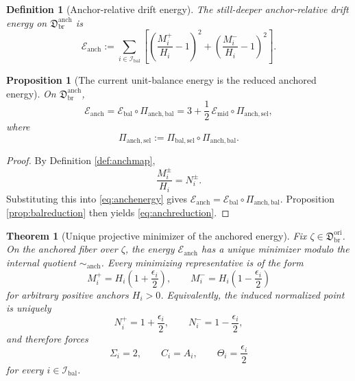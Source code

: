 \documentclass[11pt]{article}
\newcommand{\OriginSector}{\mathfrak D_{\mathrm{br}}^{\mathrm{ori}}}
\newcommand{\SelEnergy}{\mathscr E_{\mathrm{mid}}}
\newcommand{\BalSelMap}{\Pi_{\mathrm{bal,sel}}}
\newcommand{\BalEnergy}{\mathscr E_{\mathrm{bal}}}
\newcommand{\BalOriginSector}{\mathfrak D_{\mathrm{br}}^{\mathrm{anch}}}
\newcommand{\BalOriginMap}{\Pi_{\mathrm{anch,bal}}}
\newcommand{\AnchSelMap}{\Pi_{\mathrm{anch,sel}}}
\newcommand{\AnchProjRel}{\sim_{\mathrm{anch}}}
\newcommand{\AnchEnergy}{\mathscr E_{\mathrm{anch}}}
\newcommand{\BalIndex}{\mathcal I_{\mathrm{bal}}}
\newtheorem{definition}{Definition}
\newtheorem{proposition}{Proposition}
\newtheorem{theorem}{Theorem}
\begin{document}
\begin{definition}[Anchor-relative drift energy]
\label{def:anchenergy}
The still-deeper anchor-relative drift energy on \(\BalOriginSector\) is
\begin{equation}
\AnchEnergy
:=
\sum_{i\in\BalIndex}
\left[
\left(\frac{M_i^+}{H_i}-1\right)^2
+
\left(\frac{M_i^-}{H_i}-1\right)^2
\right].
\label{eq:anchenergy}
\end{equation}
\end{definition}

\begin{proposition}[The current unit-balance energy is the reduced anchored energy]
\label{prop:anchreduction}
On \(\BalOriginSector\),
\begin{equation}
\AnchEnergy
=
\BalEnergy\circ\BalOriginMap
=
3+\frac12\,\SelEnergy\circ\AnchSelMap,
\label{eq:anchreduction}
\end{equation}
where
\begin{equation}
\AnchSelMap:=\BalSelMap\circ\BalOriginMap.
\label{eq:anchseldef}
\end{equation}
\end{proposition}

\begin{proof}
By Definition \ref{def:anchmap},
\[
\frac{M_i^\pm}{H_i}=N_i^\pm.
\]
Substituting this into \eqref{eq:anchenergy} gives \(\AnchEnergy=\BalEnergy\circ\BalOriginMap\). Proposition \ref{prop:balreduction} then yields \eqref{eq:anchreduction}.
\end{proof}

\begin{theorem}[Unique projective minimizer of the anchored energy]
\label{thm:anchmin}
Fix \(\zeta\in\OriginSector\). On the anchored fiber over \(\zeta\), the energy \(\AnchEnergy\) has a unique minimizer modulo the internal quotient \(\AnchProjRel\). Every minimizing representative is of the form
\begin{equation}
M_i^+=H_i\left(1+\frac{\epsilon_i}{2}\right),
\qquad
M_i^-=H_i\left(1-\frac{\epsilon_i}{2}\right)
\label{eq:anchmin}
\end{equation}
for arbitrary positive anchors \(H_i>0\). Equivalently, the induced normalized point is uniquely
\begin{equation}
N_i^+=1+\frac{\epsilon_i}{2},
\qquad
N_i^-=1-\frac{\epsilon_i}{2},
\label{eq:balmin}
\end{equation}
and therefore forces
\begin{equation}
\Sigma_i=2,
\qquad
C_i=A_i,
\qquad
\Theta_i=\frac{\epsilon_i}{2}
\label{eq:anchmininduced}
\end{equation}
for every \(i\in\BalIndex\).
\end{theorem}
\end{document}
